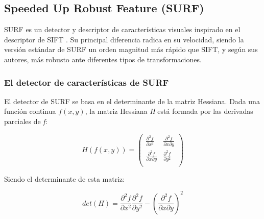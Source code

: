 \subsection{Speeded Up Robust Feature (SURF)}

SURF \cite{bay2008speeded} es un detector y descriptor de características visuales inspirado en el descriptor de SIFT \cite{Lowe04}. Su principal diferencia radica en su velocidad, siendo la versión estándar de SURF un orden magnitud más rápido que SIFT, y según sus autores, más robusto ante diferentes tipos de transformaciones.

\subsubsection{El detector de características de SURF}
El detector de SURF se basa en el determinante de la matriz Hessiana. Dada una función continua $ f(x, y) $, la matriz Hessiana \textit{H} está formada por las derivadas parciales de \textit{f}:

\begin{equation}
H(f(x, y)) =
\left(
\begin{array}{cc}
\frac{\partial^2 f}{\partial x^2} & \frac{\partial^2 f}{{\partial x}{\partial y}} \\
\frac{\partial^2 f}{{\partial x}{\partial y}} & \frac{\partial^2 f}{\partial y^2} \\
\end{array}
\right)
\end{equation}

Siendo el determinante de esta matriz:

\begin{equation}
det(H) = \frac{\partial^2 f}{\partial x^2} \frac{\partial^2 f}{\partial y^2}
	 - \left( \frac{\partial^2 f}{{\partial x}{\partial y}} \right)^ 2
\end{equation}

